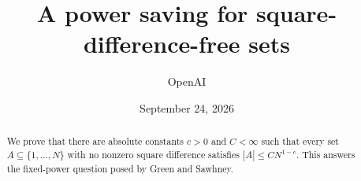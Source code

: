 \documentclass[11pt]{article}
\title{A power saving for square-difference-free sets}
\author{OpenAI}
\date{September 24, 2026}
\numberwithin{equation}{section}
\theoremstyle{definition}
\theoremstyle{remark}
\begin{document}
\maketitle
\begin{abstract}
We prove that there are absolute constants $c>0$ and $C<\infty$ such that
every set $A\subseteq\{1,\ldots,N\}$ with no nonzero square difference
satisfies $|A|\le C N^{1-c}$. This answers the fixed-power question posed
by Green and Sawhney.
\end{abstract}
\tableofcontents











\end{document}
